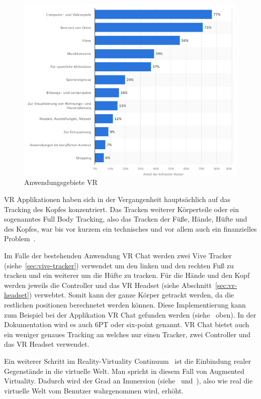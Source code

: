 \begin{figure}
    \begin{center}
        \includegraphics[scale=0.4]{pics/statistic_usage_vr}
    \end{center}
    \caption{Anwendungsgebiete VR~\cite{BITKOM_2021}}
    \label{fig:statistic_usage_vr}
\end{figure}

VR Applikationen haben sich in der Vergangenheit hauptsächlich auf das Tracking des Kopfes konzentriert.
Das Tracken weiterer Körperteile oder ein sogenanntes Full Body Tracking, also das Tracken der Füße, Hände, Hüfte und des Kopfes, war bis vor kurzem ein technisches und vor allem auch ein finanzielles Problem~\cite{PAVEL_NUZHDIN_2020}.

Im Falle der bestehenden Anwendung VR Chat werden zwei Vive Tracker (siehe~\ref{sec:vive-tracker}) verwendet um den linken und den rechten Fuß zu tracken und ein weiterer um die Hüfte zu tracken.
Für die Hände und den Kopf werden jeweils die Controller und das VR Headset (siehe Abschnitt~\ref{sec:vr-headset}) verwebtet.
Somit kann der ganze Körper getrackt werden, da die restlichen positionen berechnetet werden können.
Diese Implementierung kann zum Beispiel bei der Applikation VR Chat gefunden werden (siehe~\cite{VRCHAT_DOCS_2021} oben).
In der Dokumentation wird es auch 6PT oder six-point genannt.
VR Chat bietet auch ein weniger genaues Tracking an welches nur einen Tracker, zwei Controller und das VR Headset verwendet.

Ein weiterer Schritt im Reality-Virtuality Continuum~\cite{MILGRAM_1994} ist die Einbindung realer Gegenstände in die virtuelle Welt.
Man spricht in diesem Fall von Augmented Virtuality.
Dadurch wird der Grad an Immersion (siehe~\cite{EMEST_ADAMS_2004} und~\cite{BJOERK_2003}), also wie real die virtuelle Welt vom Benutzer wahrgenommen wird, erhöht.

